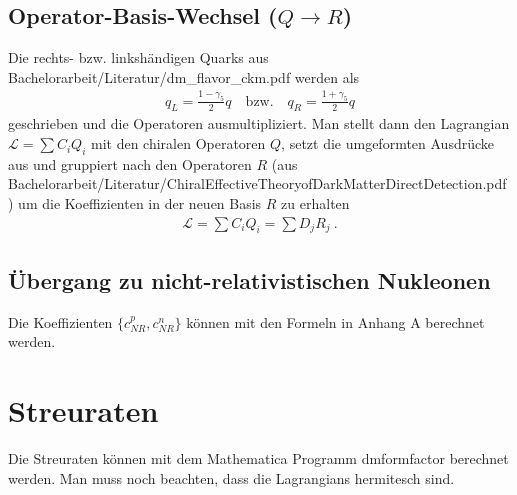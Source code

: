 \documentclass[a4,11pt]{article}
\begin{document}
	\subsection{Operator-Basis-Wechsel ($Q\rightarrow R$)}
Die rechts- bzw. linkshändigen Quarks aus Bachelorarbeit/Literatur/dm\_flavor\_ckm.pdf werden als
\begin{align*}
	q_L = \frac{1-\gamma_5}{2}q \quad \text{bzw.} \quad q_R = \frac{1+\gamma_5}{2}q
\end{align*}
geschrieben und die Operatoren ausmultipliziert. Man stellt dann den Lagrangian $\mathcal{L} = \sum C_iQ_i$ mit den chiralen Operatoren $Q$, setzt die umgeformten Ausdrücke aus und gruppiert nach den Operatoren $R$ (aus Bachelorarbeit/Literatur/ChiralEffectiveTheoryofDarkMatterDirectDetection.pdf) um die Koeffizienten in der neuen Basis $R$ zu erhalten 
\begin{align*}
	\mathcal{L} = \sum C_iQ_i = \sum D_jR_j \ .
\end{align*}
	\subsection{Übergang zu nicht-relativistischen Nukleonen}
Die Koeffizienten $\{ c_{NR}^p, c_{NR}^n \}$ können mit den Formeln in Anhang A berechnet werden.
	\section{Streuraten}
Die Streuraten können mit dem Mathematica Programm dmformfactor berechnet werden. Man muss noch beachten, dass die Lagrangians hermitesch sind.
\end{document}
